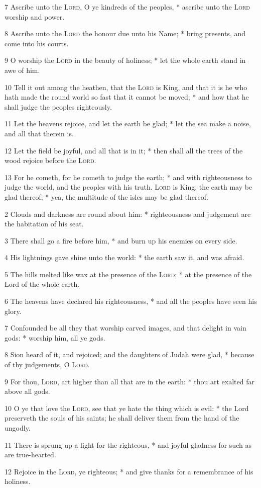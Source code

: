 7 Ascribe unto the {\textsc{Lord}}, O ye kindreds of the peoples, * ascribe unto the {\textsc{Lord}} worship and power.\par
8 Ascribe unto the {\textsc{Lord}} the honour due unto his Name; * bring presents, and come into his courts.\par
9 O worship the {\textsc{Lord}} in the beauty of holiness; * let the whole earth stand in awe of him.\par
10 Tell it out among the heathen, that the {\textsc{Lord}} is King, and that it is he who hath made the round world so fast that it cannot be moved; * and how that he shall judge the peoples righteously.\par
11 Let the heavens rejoice, and let the earth be glad; * let the sea make a noise, and all that therein is.\par
12 Let the field be joyful, and all that is in it; * then shall all the trees of the wood rejoice before the {\textsc{Lord}}.\par
13 For he cometh, for he cometh to judge the earth; * and with righteousness to judge the world, and the peoples with his truth.
 {\textsc{Lord}} is King, the earth may be glad thereof; * yea, the multitude of the isles may be glad thereof.\par
2 Clouds and darkness are round about him: * righteousness and judgement are the habitation of his seat.\par
3 There shall go a fire before him, * and burn up his enemies on every side.\par
4 His lightnings gave shine unto the world: * the earth saw it, and was afraid.\par
5 The hills melted like wax at the presence of the {\textsc{Lord}}; * at the presence of the Lord of the whole earth.\par
6 The heavens have declared his righteousness, * and all the peoples have seen his glory.\par
7 Confounded be all they that worship carved images, and that delight in vain gods: * worship him, all ye gods.\par
8 Sion heard of it, and rejoiced; and the daughters of Judah were glad, * because of thy judgements, O {\textsc{Lord}}.\par
9 For thou, {\textsc{Lord}}, art higher than all that are in the earth: * thou art exalted far above all gods.\par
10 O ye that love the {\textsc{Lord}}, see that ye hate the thing which is evil: * the Lord preserveth the souls of his saints; he shall deliver them from the hand of the ungodly.\par
11 There is sprung up a light for the righteous, * and joyful gladness for such as are true-hearted.\par
12 Rejoice in the {\textsc{Lord}}, ye righteous; * and give thanks for a remembrance of his holiness.
